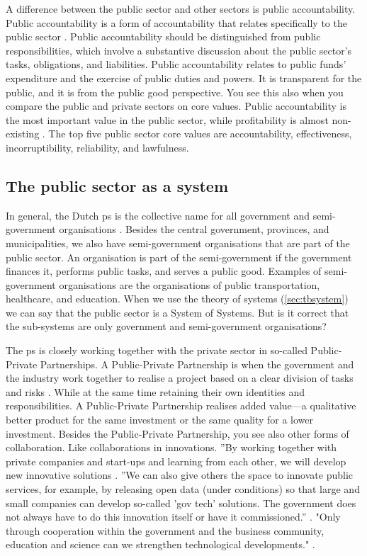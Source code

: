 A difference between the public sector and other sectors is public accountability. Public accountability is a form of accountability that relates specifically to the public sector \parencite{Boers2009}. Public accountability should be distinguished from public responsibilities, which involve a substantive discussion about the public sector's tasks, obligations, and liabilities. Public accountability relates to public funds' expenditure and the exercise of public duties and powers. It is transparent for the public, and it is from the public good perspective. You see this also when you compare the public and private sectors on core values. Public accountability is the most important value in the public sector, while profitability is almost non-existing \parencite[p.~472]{Wal2008}. The top five public sector core values are accountability, effectiveness, incorruptibility, reliability, and lawfulness.

\subsection{The public sector as a system}
\label{sub:tbpssystemofsystems}
In general, the Dutch \gls{ps} is the collective name for all government and semi-government organisations \parencite[p.~261]{Pathirane1982}. Besides the central government, provinces, and municipalities, we also have semi-government organisations that are part of the public sector. An organisation is part of the semi-government if the government finances it, performs public tasks, and serves a public good. Examples of semi-government organisations are the organisations of public transportation, healthcare, and education. When we use the theory of systems (\cref{sec:tbsystem}) we can say that the public sector is a System of Systems. But is it correct that the sub-systems are only government and semi-government organisations?

The \gls{ps} is closely working together with the private sector in so-called Public-Private Partnerships. A Public-Private Partnership is when the government and the industry work together to realise a project based on a clear division of tasks and risks \parencite[p.~8]{Enneman2007}. While at the same time retaining their own identities and responsibilities. A Public-Private Partnership realises added value—a qualitative better product for the same investment or the same quality for a lower investment. Besides the Public-Private Partnership, you see also other forms of collaboration. Like collaborations in innovations. ''By working together with private companies and start-ups and learning from each other, we will develop new innovative solutions \parencite[p.~120]{Digitaleoverheid2021}. ''We can also give others the space to innovate public services, for example, by releasing open data (under conditions) so that large and small companies can develop so-called 'gov tech' solutions. The government does not always have to do this innovation itself or have it commissioned.'' \parencite[p.~120]{Digitaleoverheid2021}. "Only through cooperation within the government and the business community, education and science can we strengthen technological developments." \parencite[p.~68]{Digitaleoverheid2021}.

